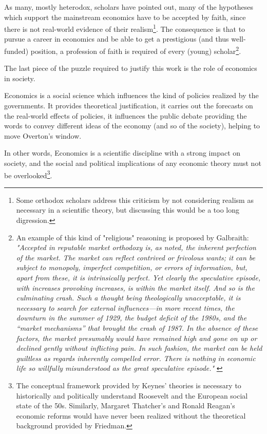 \documentclass[a4paper, 11pt, headings=standardclasses, tablecaptionsbelow]{scrartcl}
\begin{document}
As many, mostly heterodox, scholars have pointed out, many of the hypotheses which support the mainstream economics have to be accepted by faith, since there is not real-world evidence of their realism\footnote{Some orthodox scholars address this criticism by not considering realism as necessary in a scientific theory, but discussing this would be a too long digression.}.
The consequence is that to pursue a career in economics and be able to get a prestigious (and thus well-funded) position, a profession of faith is required of every (young) scholar\footnote{An example of this kind of "religious" reasoning is proposed by Galbraith: \textit{"Accepted in reputable market orthodoxy is, as noted, the inherent perfection of the market. The market can reflect contrived or frivolous wants; it can be subject to monopoly, imperfect competition, or errors of information, but, apart from these, it is intrinsically perfect. Yet clearly the speculative episode, with increases provoking increases, is within the market itself. And so is the culminating crash. Such a thought being theologically unacceptable, it is necessary to search for external influences—in more recent times, the downturn in the summer of 1929, the budget deficit of the 1980s, and the “market mechanisms” that brought the crash of 1987. In the absence of these factors, the market presumably would have remained high and gone on up or declined gently without inflicting pain. In such fashion, the market can be held guiltless as regards inherently compelled error. There is nothing in economic life so willfully misunderstood as the great speculative episode."} \parencite{galbraith1994}}.

The last piece of the puzzle required to justify this work is the role of economics in society.

Economics is a social science which influences the kind of policies realized by the governments. It provides theoretical justification, it carries out the forecasts on the real-world effects of policies, it influences the public debate providing the words to convey different ideas of the economy (and so of the society), helping to move Overton's window.

In other words, Economics is a scientific discipline with a strong impact on society, and the social and political implications of any economic theory must not be overlooked\footnote{The conceptual framework provided by Keynes' theories is necessary to historically and politically understand Roosevelt and the European social state of the 50s. Similarly, Margaret Thatcher's and Ronald Reagan's economic reforms would have never been realized without the theoretical background provided by Friedman.}.
\end{document}

